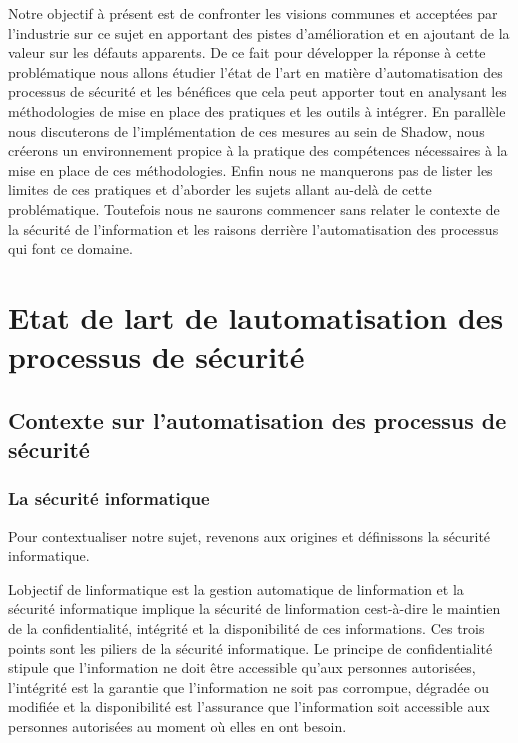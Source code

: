 \documentclass[
  11pt,
  a4paper,
  krantz2,
  11pt,
  oneside]{krantz}
\begin{document}
Notre objectif à présent est de confronter les visions communes et acceptées par l'industrie sur ce sujet en apportant des pistes d'amélioration et en ajoutant de la valeur sur les défauts apparents. De ce fait pour développer la réponse à cette problématique nous allons étudier l'état de l'art en matière d'automatisation des processus de sécurité et les bénéfices que cela peut apporter tout en analysant les méthodologies de mise en place des pratiques et les outils à intégrer. En parallèle nous discuterons de l'implémentation de ces mesures au sein de Shadow, nous créerons un environnement propice à la pratique des compétences nécessaires à la mise en place de ces méthodologies. Enfin nous ne manquerons pas de lister les limites de ces pratiques et d'aborder les sujets allant au-delà de cette problématique. Toutefois nous ne saurons commencer sans relater le contexte de la sécurité de l'information et les raisons derrière l'automatisation des processus qui font ce domaine.

\chapter{Etat de l\textquotesingle art de l\textquotesingle automatisation des processus de sécurité}\label{etat-de-lart-de-lautomatisation-des-processus-de-suxe9curituxe9}

\section{Contexte sur l'automatisation des processus de sécurité}\label{contexte-sur-lautomatisation-des-processus-de-suxe9curituxe9}

\subsection{La sécurité informatique}\label{la-suxe9curituxe9-informatique}

Pour contextualiser notre sujet, revenons aux origines et définissons la sécurité informatique.

L\textquotesingle objectif de l\textquotesingle informatique est la gestion automatique de l\textquotesingle information et la sécurité informatique implique la sécurité de l\textquotesingle information c\textquotesingle est-à-dire le maintien de la confidentialité, intégrité et la disponibilité de ces informations. Ces trois points sont les piliers de la sécurité informatique. Le principe de confidentialité stipule que l'information ne doit être accessible qu'aux personnes autorisées, l'intégrité est la garantie que l'information ne soit pas corrompue, dégradée ou modifiée et la disponibilité est l'assurance que l'information soit accessible aux personnes autorisées au moment où elles en ont besoin.
\end{document}
